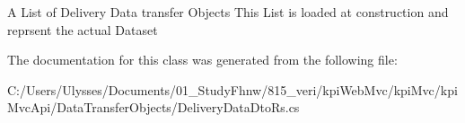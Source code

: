 A List of Delivery Data transfer Objects This List is loaded at construction and reprsent the actual Dataset 



The documentation for this class was generated from the following file\+:\begin{DoxyCompactItemize}
\item 
C\+:/\+Users/\+Ulysses/\+Documents/01\+\_\+\+Study\+Fhnw/815\+\_\+veri/kpi\+Web\+Mvc/kpi\+Mvc/kpi\+Mvc\+Api/\+Data\+Transfer\+Objects/Delivery\+Data\+Dto\+Rs.\+cs\end{DoxyCompactItemize}
